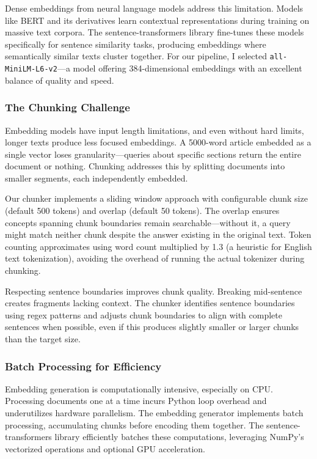 \documentclass[12pt, a4paper]{article}
\begin{document}
Dense embeddings from neural language models address this limitation. Models like BERT and its derivatives learn contextual representations during training on massive text corpora. The sentence-transformers library fine-tunes these models specifically for sentence similarity tasks, producing embeddings where semantically similar texts cluster together. For our pipeline, I selected \texttt{all-MiniLM-L6-v2}—a model offering 384-dimensional embeddings with an excellent balance of quality and speed.

\subsubsection*{The Chunking Challenge}

Embedding models have input length limitations, and even without hard limits, longer texts produce less focused embeddings. A 5000-word article embedded as a single vector loses granularity—queries about specific sections return the entire document or nothing. Chunking addresses this by splitting documents into smaller segments, each independently embedded.

Our chunker implements a sliding window approach with configurable chunk size (default 500 tokens) and overlap (default 50 tokens). The overlap ensures concepts spanning chunk boundaries remain searchable—without it, a query might match neither chunk despite the answer existing in the original text. Token counting approximates using word count multiplied by 1.3 (a heuristic for English text tokenization), avoiding the overhead of running the actual tokenizer during chunking.

Respecting sentence boundaries improves chunk quality. Breaking mid-sentence creates fragments lacking context. The chunker identifies sentence boundaries using regex patterns and adjusts chunk boundaries to align with complete sentences when possible, even if this produces slightly smaller or larger chunks than the target size.

\subsubsection*{Batch Processing for Efficiency}

Embedding generation is computationally intensive, especially on CPU. Processing documents one at a time incurs Python loop overhead and underutilizes hardware parallelism. The embedding generator implements batch processing, accumulating chunks before encoding them together. The sentence-transformers library efficiently batches these computations, leveraging NumPy's vectorized operations and optional GPU acceleration.
\end{document}
